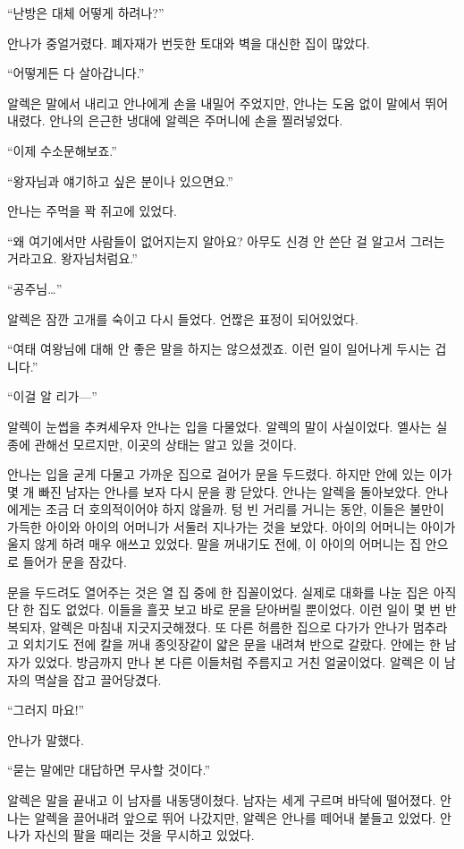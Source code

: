 ``난방은 대체 어떻게 하려나?''

안나가 중얼거렸다. 폐자재가 번듯한 토대와 벽을 대신한 집이 많았다.

``어떻게든 다 살아갑니다.''

알렉은 말에서 내리고 안나에게 손을 내밀어 주었지만, 안나는 도움 없이 말에서 뛰어내렸다. 안나의 은근한 냉대에 알렉은 주머니에 손을 찔러넣었다.

``이제 수소문해보죠.''

``왕자님과 얘기하고 싶은 분이나 있으면요.''

안나는 주먹을 꽉 쥐고에 있었다.

``왜 여기에서만 사람들이 없어지는지 알아요? 아무도 신경 안 쓴단 걸 알고서 그러는 거라고요. 왕자님처럼요.''

``공주님\ldots''

알렉은 잠깐 고개를 숙이고 다시 들었다. 언짢은 표정이 되어있었다.

``여태 여왕님에 대해 안 좋은 말을 하지는 않으셨겠죠. 이런 일이 일어나게 두시는 겁니다.''

``이걸 알 리가—''

알렉이 눈썹을 추켜세우자 안나는 입을 다물었다. 알렉의 말이 사실이었다. 엘사는 실종에 관해선 모르지만, 이곳의 상태는 알고 있을 것이다.

안나는 입을 굳게 다물고 가까운 집으로 걸어가 문을 두드렸다. 하지만 안에 있는 이가 몇 개 빠진 남자는 안나를 보자 다시 문을 쾅 닫았다. 안나는 알렉을 돌아보았다. 안나에게는 조금 더 호의적이어야 하지 않을까. 텅 빈 거리를 거니는 동안, 이들은 불만이 가득한 아이와 아이의 어머니가 서둘러 지나가는 것을 보았다. 아이의 어머니는 아이가 울지 않게 하려 매우 애쓰고 있었다. 말을 꺼내기도 전에, 이 아이의 어머니는 집 안으로 들어가 문을 잠갔다.

문을 두드려도 열어주는 것은 열 집 중에 한 집꼴이었다. 실제로 대화를 나눈 집은 아직 단 한 집도 없었다. 이들을 흘끗 보고 바로 문을 닫아버릴 뿐이었다. 이런 일이 몇 번 반복되자, 알렉은 마침내 지긋지긋해졌다. 또 다른 허름한 집으로 다가가 안나가 멈추라고 외치기도 전에 칼을 꺼내 종잇장같이 얇은 문을 내려쳐 반으로 갈랐다. 안에는 한 남자가 있었다. 방금까지 만나 본 다른 이들처럼 주름지고 거친 얼굴이었다. 알렉은 이 남자의 멱살을 잡고 끌어당겼다.

``그러지 마요!''

안나가 말했다.

``묻는 말에만 대답하면 무사할 것이다.''

알렉은 말을 끝내고 이 남자를 내동댕이쳤다. 남자는 세게 구르며 바닥에 떨어졌다. 안나는 알렉을 끌어내려 앞으로 뛰어 나갔지만, 알렉은 안나를 떼어내 붙들고 있었다. 안나가 자신의 팔을 때리는 것을 무시하고 있었다.

